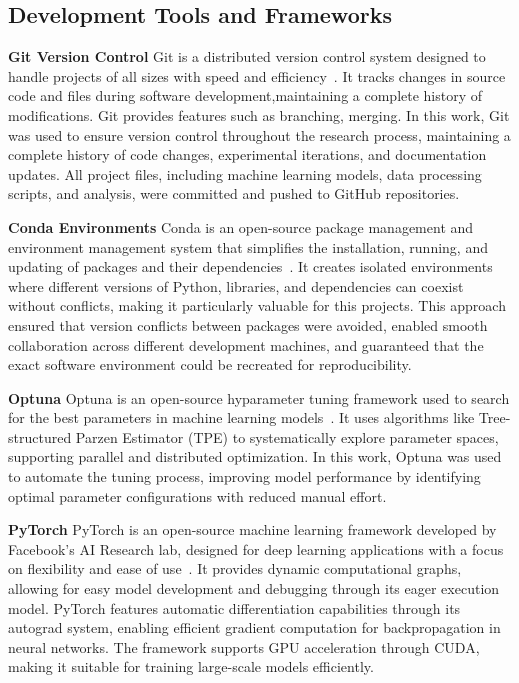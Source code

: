 \subsection{Development Tools and Frameworks}



\textbf{Git Version Control}
Git is a distributed version control system designed to handle projects of all sizes with speed and efficiency~\cite{noauthor_git_nodate}. It tracks changes in source code and files during software development,maintaining a complete history of modifications. Git provides features such as branching, merging. In this work, Git was used to ensure version control throughout the research process, maintaining a complete history of code changes, experimental iterations, and documentation updates. All project files, including machine learning models, data processing scripts, and analysis, were committed and pushed to GitHub repositories.

\textbf{Conda Environments}
Conda is an open-source package management and environment management system that simplifies the installation, running, and updating of packages and 
their dependencies~\cite{conda_contributors_conda_2025}. It creates isolated environments where different versions of Python, libraries, 
and dependencies can coexist without conflicts, making it particularly valuable for this projects. This approach ensured that version conflicts between packages were avoided, enabled smooth collaboration across different 
development machines, and guaranteed that the exact software environment could be recreated for reproducibility.

\textbf{Optuna}
\label{subsec:optuna}
Optuna is an open-source hyparameter tuning framework used to search for the best parameters in machine learning models~\cite{akiba_optuna_2019}. It uses algorithms like Tree-structured Parzen Estimator (TPE) to systematically explore parameter spaces, supporting parallel and distributed optimization. In this work, Optuna was used to automate the tuning process, improving model performance by identifying optimal parameter configurations with reduced manual effort.

\textbf{PyTorch}
PyTorch is an open-source machine learning framework developed by Facebook's AI Research lab, designed for deep learning applications with a 
focus on flexibility and ease of use~\cite{ansel_pytorch_2024}. It provides dynamic computational graphs, 
allowing for easy model development and debugging through its eager execution model. PyTorch features 
automatic differentiation capabilities through its autograd system, enabling efficient gradient computation 
for backpropagation in neural networks. The framework supports GPU acceleration through CUDA, making it suitable
for training large-scale models efficiently. 


